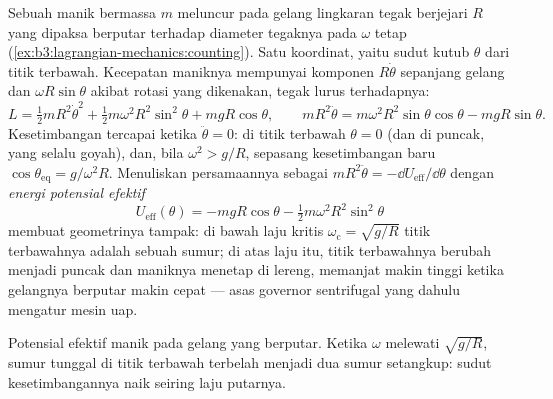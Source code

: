 \begin{example}\label{ex:b3:lagrangian-mechanics:hoop}
Sebuah manik bermassa $m$ meluncur pada gelang lingkaran tegak berjejari
$R$ yang dipaksa berputar terhadap diameter tegaknya pada $\omega$ tetap
(\cref{ex:b3:lagrangian-mechanics:counting}). Satu koordinat, yaitu
sudut kutub $\theta$ dari titik terbawah. Kecepatan maniknya mempunyai
komponen $R\dot\theta$ sepanjang gelang dan $\omega R\sin\theta$ akibat
rotasi yang dikenakan, tegak lurus terhadapnya:
\[
L = \tfrac12 mR^2\dot\theta^2 + \tfrac12 m\omega^2R^2\sin^2\theta
 + mgR\cos\theta ,
\qquad
mR^2\ddot\theta = m\omega^2R^2\sin\theta\cos\theta - mgR\sin\theta .
\]
Kesetimbangan tercapai ketika $\ddot\theta = 0$: di titik terbawah
$\theta = 0$ (dan di puncak, yang selalu goyah), dan, bila
$\omega^2 > g/R$, sepasang kesetimbangan baru
$\cos\theta_{\text{eq}} = g/\omega^2R$. Menuliskan persamaannya sebagai
$mR^2\ddot\theta = -\dd U_{\text{eff}}/\dd\theta$ dengan
\emph{energi potensial efektif}
\[
U_{\text{eff}}(\theta) = -mgR\cos\theta
 - \tfrac12 m\omega^2R^2\sin^2\theta
\]
membuat geometrinya tampak: di bawah laju kritis
$\omega_{\text{c}} = \sqrt{g/R}$ titik terbawahnya adalah sebuah sumur;
di atas laju itu, titik terbawahnya berubah menjadi puncak dan maniknya
menetap di lereng, memanjat makin tinggi ketika gelangnya berputar makin
cepat --- asas governor sentrifugal yang dahulu mengatur mesin uap.
\end{example}

\begin{omfigure}

{\small Potensial efektif manik pada gelang yang berputar. Ketika
$\omega$ melewati $\sqrt{g/R}$, sumur tunggal di titik terbawah terbelah
menjadi dua sumur setangkup: sudut kesetimbangannya naik seiring laju
putarnya.}
\end{omfigure}

